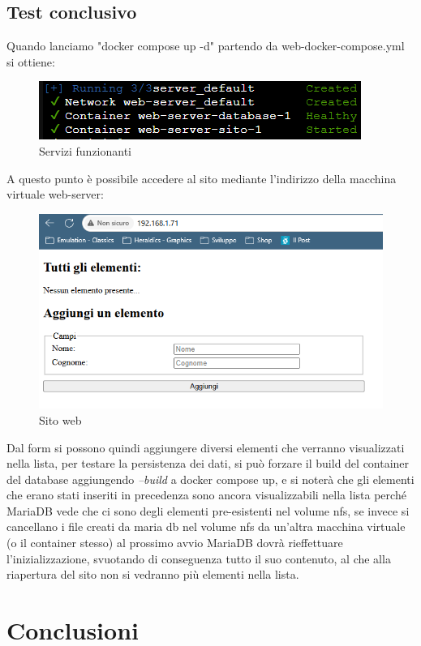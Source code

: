 \documentclass[a4paper]{article}
\begin{document}
\subsection{Test conclusivo}
Quando lanciamo "docker compose up -d" partendo da web-docker-compose.yml si ottiene:
\begin{figure}[H]
    \centering
    \includegraphics[scale=1]{images/ServiziFunzionanti.png}
    \caption{Servizi funzionanti}
\end{figure}
A questo punto è possibile accedere al sito mediante l'indirizzo della macchina virtuale web-server:
\begin{figure}[H]
    \centering
    \includegraphics[scale=0.7]{images/PaginaSito.png}
    \caption{Sito web}
\end{figure}
Dal form si possono quindi aggiungere diversi elementi che verranno visualizzati nella lista, per testare la persistenza dei dati, si può forzare il build
del container del database aggiungendo \textit{--build} a docker compose up, e si noterà che gli elementi che erano stati inseriti in precedenza sono ancora
visualizzabili nella lista perché MariaDB vede che ci sono degli elementi pre-esistenti nel volume nfs, se invece si cancellano i file creati da maria db nel volume nfs da un'altra macchina virtuale (o il container stesso) al prossimo
avvio MariaDB dovrà rieffettuare l'inizializzazione, svuotando di conseguenza tutto il suo contenuto, al che alla riapertura del sito non si vedranno più elementi nella lista.
\section{Conclusioni}
\end{document}
